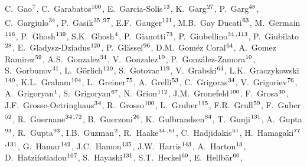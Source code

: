 \begin{flushleft}
C.~Gao$^\textrm{\scriptsize 7}$,
C.~Garabatos$^\textrm{\scriptsize 100}$,
E.~Garcia-Solis$^\textrm{\scriptsize 13}$,
K.~Garg$^\textrm{\scriptsize 27}$,
P.~Garg$^\textrm{\scriptsize 48}$,
C.~Gargiulo$^\textrm{\scriptsize 34}$,
P.~Gasik$^\textrm{\scriptsize 35}$\textsuperscript{,}$^\textrm{\scriptsize 97}$,
E.F.~Gauger$^\textrm{\scriptsize 121}$,
M.B.~Gay Ducati$^\textrm{\scriptsize 63}$,
M.~Germain$^\textrm{\scriptsize 116}$,
P.~Ghosh$^\textrm{\scriptsize 139}$,
S.K.~Ghosh$^\textrm{\scriptsize 4}$,
P.~Gianotti$^\textrm{\scriptsize 73}$,
P.~Giubellino$^\textrm{\scriptsize 34}$\textsuperscript{,}$^\textrm{\scriptsize 113}$,
P.~Giubilato$^\textrm{\scriptsize 28}$,
E.~Gladysz-Dziadus$^\textrm{\scriptsize 120}$,
P.~Gl\"{a}ssel$^\textrm{\scriptsize 96}$,
D.M.~Gom\'{e}z Coral$^\textrm{\scriptsize 64}$,
A.~Gomez Ramirez$^\textrm{\scriptsize 59}$,
A.S.~Gonzalez$^\textrm{\scriptsize 34}$,
V.~Gonzalez$^\textrm{\scriptsize 10}$,
P.~Gonz\'{a}lez-Zamora$^\textrm{\scriptsize 10}$,
S.~Gorbunov$^\textrm{\scriptsize 41}$,
L.~G\"{o}rlich$^\textrm{\scriptsize 120}$,
S.~Gotovac$^\textrm{\scriptsize 119}$,
V.~Grabski$^\textrm{\scriptsize 64}$,
L.K.~Graczykowski$^\textrm{\scriptsize 140}$,
K.L.~Graham$^\textrm{\scriptsize 104}$,
L.~Greiner$^\textrm{\scriptsize 75}$,
A.~Grelli$^\textrm{\scriptsize 53}$,
C.~Grigoras$^\textrm{\scriptsize 34}$,
V.~Grigoriev$^\textrm{\scriptsize 76}$,
A.~Grigoryan$^\textrm{\scriptsize 1}$,
S.~Grigoryan$^\textrm{\scriptsize 67}$,
N.~Grion$^\textrm{\scriptsize 112}$,
J.M.~Gronefeld$^\textrm{\scriptsize 100}$,
F.~Grosa$^\textrm{\scriptsize 30}$,
J.F.~Grosse-Oetringhaus$^\textrm{\scriptsize 34}$,
R.~Grosso$^\textrm{\scriptsize 100}$,
L.~Gruber$^\textrm{\scriptsize 115}$,
F.R.~Grull$^\textrm{\scriptsize 59}$,
F.~Guber$^\textrm{\scriptsize 52}$,
R.~Guernane$^\textrm{\scriptsize 34}$\textsuperscript{,}$^\textrm{\scriptsize 72}$,
B.~Guerzoni$^\textrm{\scriptsize 26}$,
K.~Gulbrandsen$^\textrm{\scriptsize 84}$,
T.~Gunji$^\textrm{\scriptsize 131}$,
A.~Gupta$^\textrm{\scriptsize 93}$,
R.~Gupta$^\textrm{\scriptsize 93}$,
I.B.~Guzman$^\textrm{\scriptsize 2}$,
R.~Haake$^\textrm{\scriptsize 34}$\textsuperscript{,}$^\textrm{\scriptsize 61}$,
C.~Hadjidakis$^\textrm{\scriptsize 51}$,
H.~Hamagaki$^\textrm{\scriptsize 77}$\textsuperscript{,}$^\textrm{\scriptsize 131}$,
G.~Hamar$^\textrm{\scriptsize 142}$,
J.C.~Hamon$^\textrm{\scriptsize 135}$,
J.W.~Harris$^\textrm{\scriptsize 143}$,
A.~Harton$^\textrm{\scriptsize 13}$,
D.~Hatzifotiadou$^\textrm{\scriptsize 107}$,
S.~Hayashi$^\textrm{\scriptsize 131}$,
S.T.~Heckel$^\textrm{\scriptsize 60}$,
E.~Hellb\"{a}r$^\textrm{\scriptsize 60}$,

\end{flushleft}
